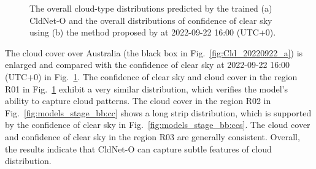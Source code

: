 \documentclass[review]{elsarticle}
\begin{document}
\begin{figure}[!htp]
    \centering
    \caption{The overall cloud-type distributions predicted by the trained (a) CldNet-O and the overall distributions of confidence of clear sky using (b) the method proposed by \citet{Shang2016JD025659} at 2022-09-22 16:00 (UTC+0).}
    \label{fig:models_stage_bb}
\end{figure}

The cloud cover over Australia (the black box in Fig.~\ref{fig:Cld_20220922_a}) is enlarged and compared with the confidence of clear sky at 2022-09-22 16:00 (UTC+0) in Fig.~\ref{fig:models_stage_bb}.
The confidence of clear sky and cloud cover in the region R01 in Fig.~\ref{fig:models_stage_bb} exhibit a very similar distribution, which verifies the model's ability to capture cloud patterns.
The cloud cover in the region R02 in Fig.~\ref{fig:models_stage_bb:cc} shows a long strip distribution, which is supported by the confidence of clear sky in Fig.~\ref{fig:models_stage_bb:ccs}.
The cloud cover and confidence of clear sky in the region R03 are generally consistent.
Overall, the results indicate that CldNet-O can capture subtle features of cloud distribution.
\end{document}
